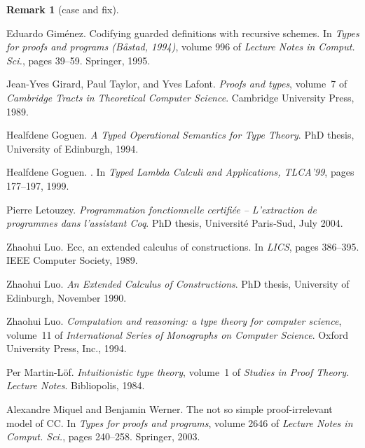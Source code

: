 \documentclass{LMCS}
\theoremstyle{plain}
\theoremstyle{definition}
\newtheorem{remm}[thm]{Remark}
\begin{document}
\begin{remm}[\textsf{case} and \textsf{fix}]
\begin{thebibliography}{[10]}
Eduardo Gim{\'e}nez.
\newblock Codifying guarded definitions with recursive schemes.
\newblock In \emph{Types for proofs and programs (B\aa stad, 1994)}, volume 996
  of \emph{Lecture Notes in Comput. Sci.}, pages 39--59. Springer, 1995.

Jean-Yves Girard, Paul Taylor, and Yves Lafont.
\newblock \emph{Proofs and types}, volume~7 of \emph{Cambridge Tracts in
  Theoretical Computer Science}.
\newblock Cambridge University Press, 1989.

Healfdene Goguen.
\newblock \emph{A {T}yped {O}perational {S}emantics for {T}ype {T}heory}.
\newblock PhD thesis, University of Edinburgh, 1994.

Healfdene Goguen.
.
\newblock In \emph{Typed Lambda Calculi and Applications, TLCA'99}, pages
  177--197, 1999.

Pierre Letouzey.
\newblock \emph{Programmation fonctionnelle certifi{\'e}e -- L'extraction de
  programmes dans l'assistant {Coq}}.
\newblock PhD thesis, Universit{\'e} Paris-Sud, July 2004.

Zhaohui Luo.
\newblock Ecc, an extended calculus of constructions.
\newblock In \emph{LICS}, pages 386--395. IEEE Computer Society, 1989.

Zhaohui Luo.
\newblock \emph{An {E}xtended {C}alculus of {C}onstructions}.
\newblock PhD thesis, University of Edinburgh, November 1990.

Zhaohui Luo.
\newblock \emph{Computation and reasoning: a type theory for computer science},
  volume~11 of \emph{International Series of Monographs on Computer Science}.
\newblock Oxford University Press, Inc., 1994.

Per Martin-L{\"o}f.
\newblock \emph{Intuitionistic type theory}, volume~1 of \emph{Studies in Proof
  Theory. Lecture Notes}.
\newblock Bibliopolis, 1984.

Alexandre Miquel and Benjamin Werner.
\newblock The not so simple proof-irrelevant model of {CC}.
\newblock In \emph{Types for proofs and programs}, volume 2646 of \emph{Lecture
  Notes in Comput. Sci.}, pages 240--258. Springer, 2003.


\end{thebibliography}
\end{remm}
\end{document}
